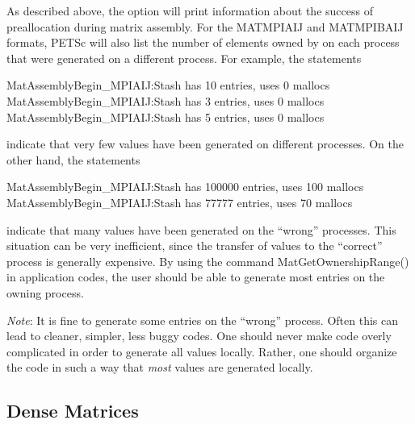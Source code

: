 As described above, the option  
will print information about the success of preallocation during
matrix assembly.  For the MATMPIAIJ and MATMPIBAIJ formats, PETSc will also list
the number of elements owned by on each process that were generated
on a different process.  For example, the statements
\begin{tabbing}
   MatAssemblyBegin\_MPIAIJ:Stash has 10 entries, uses 0 mallocs \\
   MatAssemblyBegin\_MPIAIJ:Stash has 3 entries, uses 0 mallocs \\
   MatAssemblyBegin\_MPIAIJ:Stash has 5 entries, uses 0 mallocs
\end{tabbing}
indicate that very few values have been generated on different processes.
On the other hand, the statements
\begin{tabbing}
   MatAssemblyBegin\_MPIAIJ:Stash has 100000 entries, uses 100 mallocs \\
   MatAssemblyBegin\_MPIAIJ:Stash has 77777 entries, uses 70 mallocs
\end{tabbing}
indicate that many values have been generated on the ``wrong'' processes.
This situation can be very inefficient, since the transfer of values
to the ``correct'' process is generally expensive.  By using the command
MatGetOwnershipRange() in application codes, the user should be able
to generate most entries on the owning process.

{\em Note}: It is fine to generate some entries on the ``wrong'' process. Often
this can lead to cleaner, simpler, less buggy codes.  One should never
make code overly complicated in order to generate all values locally. Rather,
one should organize the code in such a way that {\em most} values are generated locally.

\subsection{Dense Matrices}
\label{sec_matdense}

